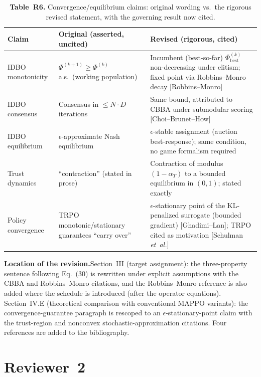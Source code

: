 \documentclass[11pt]{article}
\newcommand{\loc}{\medskip\noindent\textbf{Location of the revision.}\quad}
\begin{document}
\begin{table}[h]
\centering
\caption*{\small\textbf{Table~R6.} Convergence/equilibrium claims: original wording vs.\ the
rigorous revised statement, with the governing result now cited.}
\renewcommand{\arraystretch}{1.3}
\footnotesize
\begin{tabular}{@{}p{} p{} p{}@{}}
\toprule
\textbf{Claim} & \textbf{Original (asserted, uncited)} & \textbf{Revised (rigorous, cited)}\\
\midrule
IDBO monotonicity & $\Phi^{(k+1)}\!\ge\!\Phi^{(k)}$ a.s.\ (working population) & Incumbent (best-so-far) $\Phi_{\mathrm{best}}^{(k)}$ non-decreasing under elitism; fixed point via Robbins--Monro decay [Robbins--Monro]\\
IDBO consensus & Consensus in $\le N\!\cdot\!D$ iterations & Same bound, attributed to CBBA under submodular scoring [Choi--Brunet--How]\\
IDBO equilibrium & $\epsilon$-approximate Nash equilibrium & $\epsilon$-stable assignment (auction best-response); same condition, no game formalism required\\
Trust dynamics & ``contraction'' (stated in prose) & Contraction of modulus $(1-\alpha_T)$ to a bounded equilibrium in $(0,1)$; stated exactly\\
Policy convergence & TRPO monotonic/stationary guarantees ``carry over'' & $\epsilon$-stationary point of the KL-penalized surrogate (bounded gradient) [Ghadimi--Lan]; TRPO cited as motivation [Schulman \emph{et~al.}]\\
\bottomrule
\end{tabular}
\end{table}

\loc Section~III (target assignment): the three-property sentence following Eq.~(30) is
rewritten under explicit assumptions with the CBBA and Robbins--Monro citations, and the
Robbins--Monro reference is also added where the schedule is introduced (after the operator
equations). Section~IV.E (theoretical comparison with conventional MAPPO variants): the
convergence-guarantee paragraph is rescoped to an $\epsilon$-stationary-point claim with the
trust-region and nonconvex stochastic-approximation citations. Four references are added to
the bibliography.

\clearpage






\section*{Reviewer~2}
\end{document}
